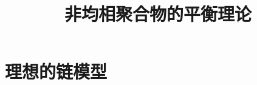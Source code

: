 \documentclass[12pt,a4paper]{article}
\title{非均相聚合物的平衡理论}
\author{}
\date{\chntoday}
\numberwithin{equation}{section}
\begin{document}
\maketitle
\section{}
\section{理想的链模型}







\cite{tam19912d}

\end{document}
